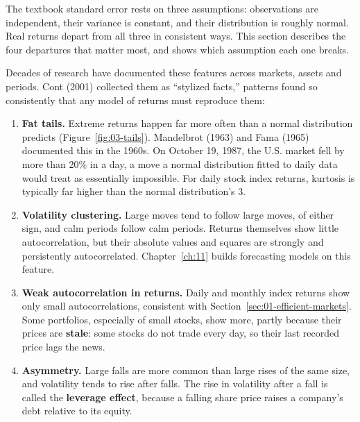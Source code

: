 The textbook standard error rests on three assumptions: observations are
independent, their variance is constant, and their distribution is roughly
normal. Real returns depart from all three in consistent ways. This section
describes the four departures that matter most, and shows which assumption each
one breaks.

Decades of research have documented these features across markets, assets and
periods. Cont (2001) collected them as ``stylized facts,'' patterns found so
consistently that any model of returns must reproduce them:

\begin{enumerate}
  \item \textbf{Fat tails.} Extreme returns happen far more often than a normal distribution predicts (Figure~\ref{fig:03-tails}). Mandelbrot (1963) and Fama (1965) documented this in the 1960s. On October 19, 1987, the U.S. market fell by more than 20\% in a day, a move a normal distribution fitted to daily data would treat as essentially impossible. For daily stock index returns, kurtosis is typically far higher than the normal distribution's 3.
  \item \textbf{Volatility clustering.} Large moves tend to follow large moves, of either sign, and calm periods follow calm periods. Returns themselves show little autocorrelation, but their absolute values and squares are strongly and persistently autocorrelated. Chapter~\ref{ch:11} builds forecasting models on this feature.
  \item \textbf{Weak autocorrelation in returns.} Daily and monthly index returns show only small autocorrelations, consistent with Section~\ref{sec:01-efficient-markets}. Some portfolios, especially of small stocks, show more, partly because their prices are \textbf{stale}: some stocks do not trade every day, so their last recorded price lags the news.
  \item \textbf{Asymmetry.} Large falls are more common than large rises of the same size, and volatility tends to rise after falls. The rise in volatility after a fall is called the \textbf{leverage effect}, because a falling share price raises a company's debt relative to its equity.
\end{enumerate}


